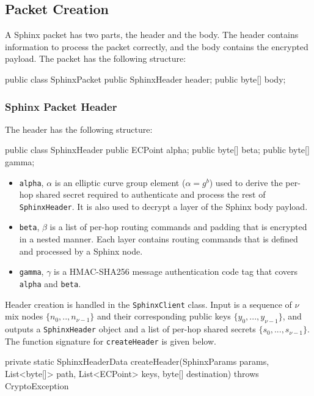\documentclass[final,dissertation.tex]{subfiles}
\begin{document}
\subsection{Packet Creation}

A Sphinx packet has two parts, the header and the body. The header contains information to process the packet correctly, and the body contains the encrypted payload. The packet has the following structure:

\begin{javacode}
public class SphinxPacket {
    public SphinxHeader header;
    public byte[] body;
}
\end{javacode}

\subsubsection{Sphinx Packet Header}

The header has the following structure:

\begin{javacode}
public class SphinxHeader {
    public ECPoint alpha;
    public byte[] beta;
    public byte[] gamma;
}
\end{javacode}

\begin{itemize}
	\item \verb|alpha|, $\alpha$ is an elliptic curve group element ($\alpha = g^b$) used to derive the per-hop shared secret required to authenticate and process the rest of \verb|SphinxHeader|. It is also used to decrypt a layer of the Sphinx body payload.
	\item \verb|beta|, $\beta$ is a list of per-hop routing commands and padding that is encrypted in a nested manner. Each layer contains routing commands that is defined and processed by a Sphinx node.
	\item \verb|gamma|, $\gamma$ is a HMAC-SHA256 message authentication code tag that covers \verb|alpha| and \verb|beta|.
\end{itemize}

Header creation is handled in the \verb|SphinxClient| class. Input is a sequence of $\nu$ mix nodes $\{n_0,..,n_{\nu-1}\}$ and their corresponding public keys $\{y_0,...,y_{\nu-1}\}$, and outputs a \verb|SphinxHeader| object and a list of per-hop shared secrets $\{s_0,...,s_{\nu-1}\}$. The function signature for \verb|createHeader| is given below.

\begin{javacode}
private static SphinxHeaderData createHeader(SphinxParams params,
    List<byte[]> path,
    List<ECPoint> keys,
    byte[] destination) throws CryptoException
\end{javacode}
\end{document}
